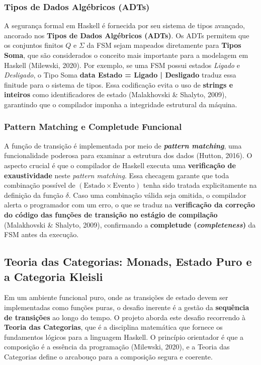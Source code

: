 \documentclass[12pt,a4paper]{article}
\begin{document}
\subsubsection{Tipos de Dados Algébricos (ADTs)}
A segurança formal em Haskell é fornecida por seu sistema de tipos avançado, ancorado nos \textbf{Tipos de Dados Algébricos (ADTs)}. Os ADTs permitem que os conjuntos finitos $Q$ e $\Sigma$ da FSM sejam mapeados diretamente para \textbf{Tipos Soma}, que são considerados o conceito mais importante para a modelagem em Haskell (Milewski, 2020). Por exemplo, se uma FSM possui estados \textit{Ligado} e \textit{Desligado}, o Tipo Soma \textbf{data Estado = Ligado | Desligado} traduz essa finitude para o sistema de tipos. Essa codificação evita o uso de \textbf{strings e inteiros} como identificadores de estado (Malakhovski \& Shalyto, 2009), garantindo que o compilador imponha a integridade estrutural da máquina.

\subsubsection{Pattern Matching e Completude Funcional}
A função de transição é implementada por meio de \textbf{\textit{pattern matching}}, uma funcionalidade poderosa para examinar a estrutura dos dados (Hutton, 2016). O aspecto crucial é que o compilador de Haskell executa uma \textbf{verificação de exaustividade} neste \textit{pattern matching}. Essa checagem garante que toda combinação possível de $(\text{Estado} \times \text{Evento})$ tenha sido tratada explicitamente na definição da função $\delta$. Caso uma combinação válida seja omitida, o compilador alerta o programador com um erro, o que se traduz na \textbf{verificação da correção do código das funções de transição no estágio de compilação} (Malakhovski \& Shalyto, 2009), confirmando a \textbf{completude (\textit{completeness})} da FSM antes da execução.

\subsection{Teoria das Categorias: Monads, Estado Puro e a Categoria Kleisli}
Em um ambiente funcional puro, onde as transições de estado devem ser implementadas como funções puras, o desafio inerente é a gestão da \textbf{sequência de transições} ao longo do tempo. O projeto aborda este desafio recorrendo à \textbf{Teoria das Categorias}, que é a disciplina matemática que fornece os fundamentos lógicos para a linguagem Haskell. O princípio orientador é que a composição é a essência da programação (Milewski, 2020), e a Teoria das Categorias define o arcabouço para a composição segura e coerente.
\end{document}
